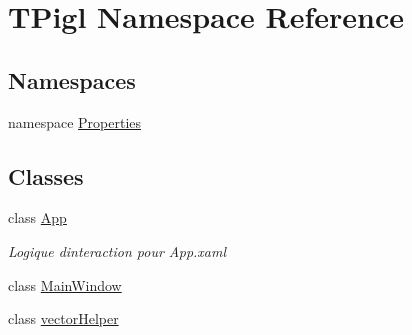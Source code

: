 \hypertarget{namespace_t_pigl}{}\section{T\+Pigl Namespace Reference}
\label{namespace_t_pigl}
\subsection*{Namespaces}
\begin{DoxyCompactItemize}
\item 
namespace \hyperlink{namespace_t_pigl_1_1_properties}{Properties}
\end{DoxyCompactItemize}
\subsection*{Classes}
\begin{DoxyCompactItemize}
\item 
class \hyperlink{class_t_pigl_1_1_app}{App}
\begin{DoxyCompactList}\small\item\em Logique d\textquotesingle{}interaction pour App.\+xaml \end{DoxyCompactList}\item 
class \hyperlink{class_t_pigl_1_1_main_window}{Main\+Window}
\item 
class \hyperlink{class_t_pigl_1_1vector_helper}{vector\+Helper}
\end{DoxyCompactItemize}
